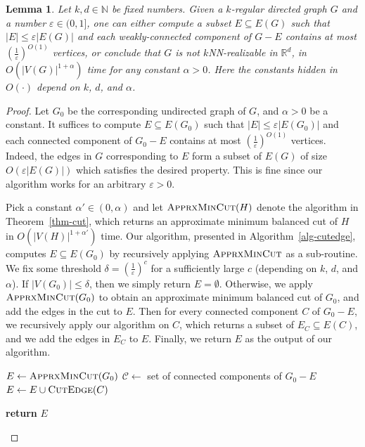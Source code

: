 \documentclass[11pt]{article}
\newtheorem{lemma}{Lemma}
\begin{document}
\begin{lemma} \label{lem-edgeremoval}
Let $k, d \in \mathbb{N}$ be fixed numbers.
Given a $k$-regular directed graph $G$ and a number $\varepsilon \in (0,1]$, one can either compute a subset $E \subseteq E(G)$ such that $|E| \leq \varepsilon |E(G)|$ and each weakly-connected component of $G - E$ contains at most $(\frac{1}{\varepsilon})^{O(1)}$ vertices, or conclude that $G$ is not $k$NN-realizable in $\mathbb{R}^d$, in $O(|V(G)|^{1+\alpha})$ time for any constant $\alpha > 0$.
Here the constants hidden in $O(\cdot)$ depend on $k$, $d$, and $\alpha$.
\end{lemma}
\begin{proof}
Let $G_0$ be the corresponding undirected graph of $G$, and $\alpha > 0$ be a constant.
It suffices to compute $E \subseteq E(G_0)$ such that $|E| \leq \varepsilon |E(G_0)|$ and each connected component of $G_0 - E$ contains at most $(\frac{1}{\varepsilon})^{O(1)}$ vertices.
Indeed, the edges in $G$ corresponding to $E$ form a subset of $E(G)$ of size $O(\varepsilon |E(G)|)$ which satisfies the desired property.
This is fine since our algorithm works for an arbitrary $\varepsilon > 0$.

Pick a constant $\alpha' \in (0,\alpha)$ and let $\textsc{ApprxMinCut}(H)$ denote the algorithm in Theorem~\ref{thm-cut}, which returns an approximate minimum balanced cut of $H$ in $O(|V(H)|^{1+\alpha'})$ time.
Our algorithm, presented in Algorithm~\ref{alg-cutedge}, computes $E \subseteq E(G_0)$ by recursively applying $\textsc{ApprxMinCut}$ as a sub-routine.
We fix some threshold $\delta = (\frac{1}{\varepsilon})^c$ for a sufficiently large $c$ (depending on $k$, $d$, and $\alpha$).
If $|V(G_0)| \leq \delta$, then we simply return $E = \emptyset$.
Otherwise, we apply $\textsc{ApprxMinCut}(G_0)$ to obtain an approximate minimum balanced cut of $G_0$, and add the edges in the cut to $E$.
Then for every connected component $C$ of $G_0 - E$, we recursively apply our algorithm on $C$, which returns a subset of $E_C \subseteq E(C)$, and we add the edges in $E_C$ to $E$.
Finally, we return $E$ as the output of our algorithm.

\begin{algorithm}[htbp]
    \caption{\textsc{CutEdge}$(G_0)$}
    \begin{algorithmic}[1]
            \begin{nolinenumbers}
            \end{nolinenumbers}
        \EndIf
        \State $E \leftarrow \textsc{ApprxMinCut}(G_0)$
        \State $\mathcal{C} \leftarrow$ set of connected components of $G_0 - E$
            \State $E \leftarrow E \cup \textsc{CutEdge}(C)$
            \begin{nolinenumbers}
            \end{nolinenumbers}
        \EndFor
        \State \textbf{return} $E$
    \end{algorithmic}
    \label{alg-cutedge}
\end{algorithm}


\end{proof}
\end{document}
